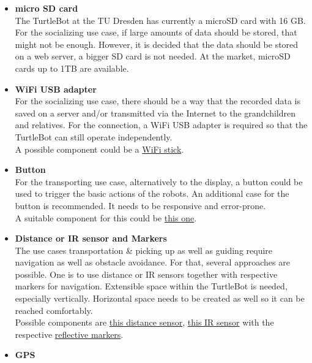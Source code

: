 \documentclass[plainarticle,zihtitle,english,final,hyperref,utf8]{zihpub}
\begin{document}
\begin{itemize}
    \item \textbf{micro SD card}\\
    The TurtleBot at the TU Dresden has currently a microSD card with 16 GB. For the socializing use case, if large amounts of data should be stored, that might not be enough. However, it is decided that the data should be stored on a web server, a bigger SD card is not needed. At the market, microSD cards up to 1TB are available.
    \item \textbf{WiFi USB adapter}\\
    For the socializing use case, there should be a way that the recorded data is saved on a server and/or transmitted via the Internet to the grandchildren and relatives. For the connection, a WiFi USB adapter is required so that the TurtleBot can still operate independently.\\
    A possible component could be a \href{https://www.amazon.de/TP-Link-TL-WN823N-Adapter-geringe-geeignet/dp/B0088TKTY2/}{WiFi stick}.\\
    \item \textbf{Button}\\
    For the transporting use case, alternatively to the display, a button could be used to trigger the basic actions of the robots. An additional case for the button is recommended. It needs to be responsive and error-prone.\\
    A suitable component for this could be \href{https://www.reichelt.de/entwicklerboards-taster-modul-debo-button-p239110.html}{this one}.\\
    \item \textbf{Distance or IR sensor and Markers}\\
    The use cases transportation \& picking up as well as guiding require navigation as well as obstacle avoidance. For that, several approaches are possible. One is to use distance or IR sensors together with respective markers for navigation. Extensible space within the TurtleBot is needed, especially vertically. Horizontal space needs to be created as well so it can be reached comfortably.\\
    Possible components are \href{https://emanual.robotis.com/docs/en/parts/sensor/dms-80/}{this distance sensor}, \href{https://emanual.robotis.com/docs/en/parts/sensor/irss-10/}{this IR sensor} with the respective \href{https://www.asmc.de/clawgear-patch-ir-reflective-2er-pack}{reflective markers}.\\
    \item \textbf{GPS}\\

\end{itemize}
\end{document}
